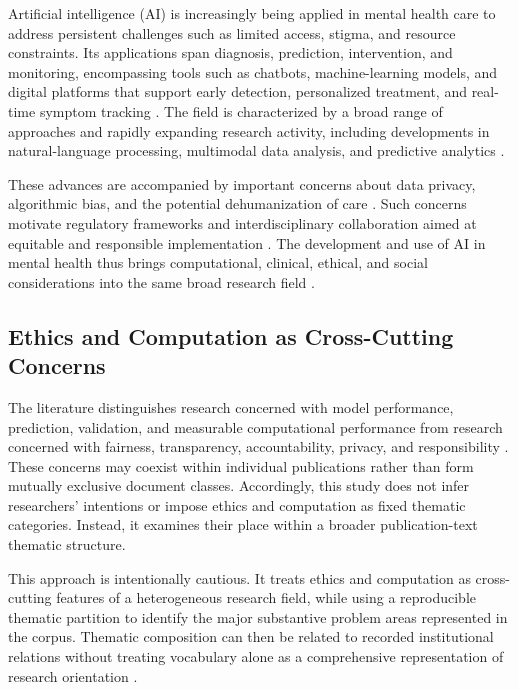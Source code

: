 \documentclass[12pt]{article}
\begin{document}
Artificial intelligence (AI) is increasingly being applied in mental health care to address persistent challenges such as limited access, stigma, and resource constraints. Its applications span diagnosis, prediction, intervention, and monitoring, encompassing tools such as chatbots, machine-learning models, and digital platforms that support early detection, personalized treatment, and real-time symptom tracking \citep{beg2025,raygozal2025,saputra2026}. The field is characterized by a broad range of approaches and rapidly expanding research activity, including developments in natural-language processing, multimodal data analysis, and predictive analytics \citep{pardo2026,elsayary2026,jin2023}.

These advances are accompanied by important concerns about data privacy, algorithmic bias, and the potential dehumanization of care \citep{bansal2026,raygozal2025}. Such concerns motivate regulatory frameworks and interdisciplinary collaboration aimed at equitable and responsible implementation \citep{beg2025,mikaeili2025,riva2025}. The development and use of AI in mental health thus brings computational, clinical, ethical, and social considerations into the same broad research field \citep{maidment2026,carneiro2025,pardo2026}.

\subsection{Ethics and Computation as Cross-Cutting Concerns}

The literature distinguishes research concerned with model performance, prediction, validation, and measurable computational performance from research concerned with fairness, transparency, accountability, privacy, and responsibility \citep{mller2017,muoz2008}. These concerns may coexist within individual publications rather than form mutually exclusive document classes. Accordingly, this study does not infer researchers' intentions or impose ethics and computation as fixed thematic categories. Instead, it examines their place within a broader publication-text thematic structure.

This approach is intentionally cautious. It treats ethics and computation as cross-cutting features of a heterogeneous research field, while using a reproducible thematic partition to identify the major substantive problem areas represented in the corpus. Thematic composition can then be related to recorded institutional relations without treating vocabulary alone as a comprehensive representation of research orientation \citep{wouters2006,mller2017}.
\end{document}
